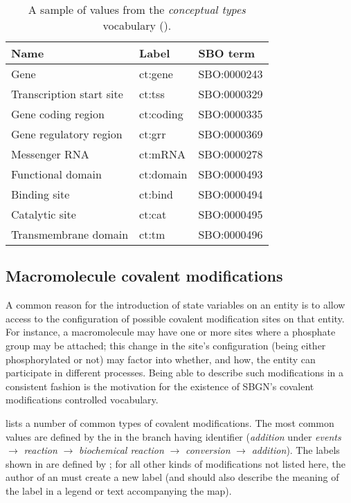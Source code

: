 \begin{table}[h]
  \centering
  \begin{tabular}{l>{\ttfamily}ll}
    \toprule
    \textbf{Name}              & \textbf{\rmfamily Label} & \textbf{SBO term} \\
    \midrule
    Gene                      & ct:gene   & SBO:0000243\\
    Transcription start site  & ct:tss    & SBO:0000329\\
    Gene coding region        & ct:coding & SBO:0000335\\
    Gene regulatory region    & ct:grr    & SBO:0000369\\
    Messenger RNA             & ct:mRNA   & SBO:0000278\\
    Functional domain         & ct:domain & SBO:0000493\\
    Binding site              & ct:bind   & SBO:0000494\\
    Catalytic site            & ct:cat    & SBO:0000495\\
    Transmembrane domain      & ct:tm     & SBO:0000496\\
    \bottomrule
  \end{tabular}
  \caption{A sample of values from the \emph{conceptual types} vocabulary
    ().}
  \label{tab:conceptual-types-cv}
\end{table}

\subsection{Macromolecule covalent modifications}
\label{sec:covalent-mod-cv}

A common reason for the introduction of state variables on an entity is to allow access to the configuration of possible covalent modification sites on that entity.  For instance, a macromolecule may have one or more sites where a phosphate group may be attached; this change in the site's configuration (\ie being either phosphorylated or not) may factor into whether, and how, the entity can participate in different processes.  Being able to describe such modifications in a consistent fashion is the motivation for the existence of SBGN's covalent modifications controlled vocabulary.  

 lists a number of common types of covalent modifications.  The most common values are defined by the \sbo in the branch having identifier  (\emph{addition} under \emph{events} $\rightarrow$ \emph{reaction} $\rightarrow$ \emph{biochemical reaction} $\rightarrow$ \emph{conversion} $\rightarrow$ \emph{addition}). The labels shown in  are defined by \SBGNERLone; for all other kinds of modifications not listed here, the author of an \ERm must create a new label (and should also describe the meaning of the label in a legend or text accompanying the map).

